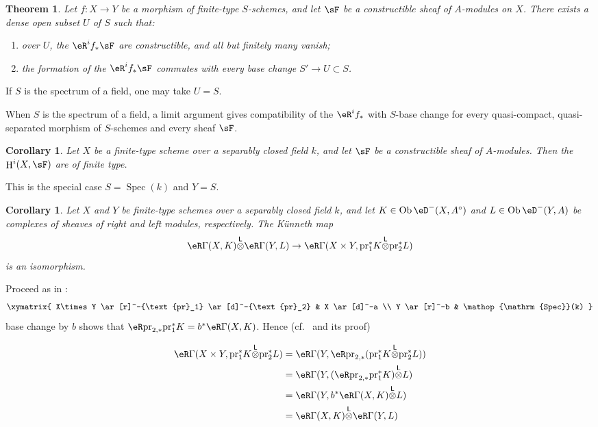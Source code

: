 \documentclass[12pt,oneside,english]{smfbook}
\DeclareMathOperator{\h}{H}
\DeclareMathOperator{\ob}{Ob}
\DeclareMathOperator{\spec}{Spec}
\newcommand{\lotimes}{{\overset{\mathsf{L}}{\otimes}}}
\newcommand{\pr}{\mathrm{pr}} %
\newtheorem{corollary_}[subsection]{Corollary}
\newtheorem{theorem_}[subsection]{Theorem}
\begin{document}
\begin{theorem_}\label{VII:1-9}
Let $f:X\to Y$ be a morphism of finite-type $S$-schemes, and let $\sF$ be a constructible sheaf of $A$-modules on $X$. There exists a dense open subset $U$ of $S$ such that:
\begin{enumerate}[\indent (i)]
  \item over $U$, the $\eR^if_\ast\sF$ are constructible, and all but finitely many vanish;
  \item the formation of the $\eR^if_\ast\sF$ commutes with every base change $S'\to U\subset S$.
\end{enumerate}
\end{theorem_}

If $S$ is the spectrum of a field, one may take $U=S$.

When $S$ is the spectrum of a field, a limit argument gives compatibility of the $\eR^if_\ast$ with $S$-base change for every quasi-compact, quasi-separated morphism of $S$-schemes and every sheaf $\sF$.

\begin{corollary_}\label{VII:1-10}
Let $X$ be a finite-type scheme over a separably closed field $k$, and let $\sF$ be a constructible sheaf of $A$-modules. Then the $\h^i(X,\sF)$ are of finite type.
\end{corollary_}

This is the special case $S=\spec(k)$ and $Y=S$.

\begin{corollary_}\label{VII:1-11}
Let $X$ and $Y$ be finite-type schemes over a separably closed field $k$, and let $K\in\ob\eD^-(X,A^\circ)$ and $L\in\ob\eD^-(Y,A)$ be complexes of sheaves of right and left modules, respectively. The Künneth map
\[
  \eR \Gamma(X,K) \lotimes \eR \Gamma(Y,L) \to \eR\Gamma(X\times Y,\pr_1^\ast K \lotimes \pr_2^\ast L)
\]
is an isomorphism.
\end{corollary_}

Proceed as in \cite[XVII, 5.4.3]{sga4}:
\[\xymatrix{
  X\times Y \ar[r]^-{\text{pr}_1} \ar[d]^-{\text{pr}_2}
    & X \ar[d]^-a \\
  Y \ar[r]^-b
    & \spec(k)
}\]
base change by $b$ shows that $\eR\pr_{2,\ast}\pr_1^\ast K=b^\ast\eR\Gamma(X,K)$. Hence (cf.\ \cite[XVII, 5.2.11]{sga4} and its proof)

\begin{align*}
  \eR\Gamma(X\times Y,\pr_1^\ast K\lotimes \pr_2^\ast L)
    &= \eR\Gamma(Y,\eR \pr_{2,\ast}(\pr_1^\ast K\lotimes \pr_2^\ast L)) \\
    &= \eR\Gamma(Y,(\eR\pr_{2,\ast}\pr_1^\ast K)\lotimes L) \\
    &= \eR\Gamma(Y,b^\ast \eR\Gamma(X,K)\lotimes L) \\
    &= \eR\Gamma(X,K)\lotimes \eR\Gamma(Y,L)
\end{align*}
\end{document}
